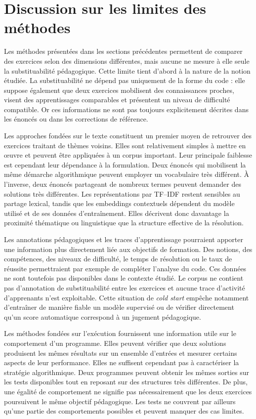 \documentclass[12pt,a4paper,oneside]{report}
\begin{document}
\section{Discussion sur les limites des méthodes}

Les méthodes présentées dans les sections précédentes permettent de comparer
des exercices selon des dimensions différentes, mais aucune ne mesure à elle
seule la substituabilité pédagogique. Cette limite tient d'abord à la nature
de la notion étudiée. La substituabilité ne dépend pas uniquement de la forme
du code : elle suppose également que deux exercices mobilisent des
connaissances proches, visent des apprentissages comparables et présentent un
niveau de difficulté compatible. Or ces informations ne sont pas toujours
explicitement décrites dans les énoncés ou dans les corrections de référence.

Les approches fondées sur le texte constituent un premier moyen de retrouver
des exercices traitant de thèmes voisins. Elles sont relativement simples à
mettre en œuvre et peuvent être appliquées à un corpus important. Leur
principale faiblesse est cependant leur dépendance à la formulation. Deux
énoncés qui mobilisent la même démarche algorithmique peuvent employer un
vocabulaire très différent. À l'inverse, deux énoncés partageant de nombreux
termes peuvent demander des solutions très différentes. Les représentations
par TF--IDF restent sensibles au partage lexical, tandis que les embeddings
contextuels dépendent du modèle utilisé et de ses données d'entraînement.
Elles décrivent donc davantage la proximité thématique ou linguistique que la
structure effective de la résolution.

Les annotations pédagogiques et les traces d'apprentissage pourraient apporter
une information plus directement liée aux objectifs de formation. Des notions,
des compétences, des niveaux de difficulté, le temps de résolution ou le taux
de réussite permettraient par exemple de compléter l'analyse du code. Ces
données ne sont toutefois pas disponibles dans le contexte étudié. Le corpus
ne contient pas d'annotation de substituabilité entre les exercices et aucune
trace d'activité d'apprenants n'est exploitable. Cette situation de
\emph{cold start} empêche notamment d'entraîner de manière fiable un modèle
supervisé ou de vérifier directement qu'un score automatique correspond à un
jugement pédagogique.

Les méthodes fondées sur l'exécution fournissent une information utile sur le
comportement d'un programme. Elles peuvent vérifier que deux solutions
produisent les mêmes résultats sur un ensemble d'entrées et mesurer certains
aspects de leur performance. Elles ne suffisent cependant pas à caractériser
la stratégie algorithmique. Deux programmes peuvent obtenir les mêmes sorties
sur les tests disponibles tout en reposant sur des structures très différentes.
De plus, une égalité de comportement ne signifie pas nécessairement que les
deux exercices poursuivent le même objectif pédagogique. Les tests ne couvrent
par ailleurs qu'une partie des comportements possibles et peuvent manquer des
cas limites.
\end{document}

